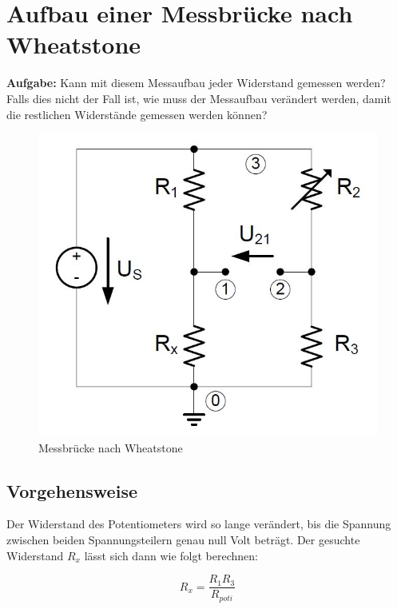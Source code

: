 \documentclass[10pt]{report}
\begin{document}
        \section{Aufbau einer Messbrücke nach Wheatstone}
        \textbf{Aufgabe:} Kann mit diesem Messaufbau jeder Widerstand gemessen werden? Falls dies nicht der
        Fall ist, wie muss der Messaufbau verändert werden, damit die restlichen Widerstände
        gemessen werden können?

		\begin{figure}[H]
            \includegraphics[width=\textwidth]{Wheatstone.jpg}
          \caption{Messbrücke nach Wheatstone}
        \end{figure}
		
        \subsection{Vorgehensweise}
        Der Widerstand des Potentiometers wird so lange verändert, bis die Spannung
        zwischen beiden Spannungsteilern genau null Volt beträgt. Der gesuchte
        Widerstand $R_x$ lässt sich dann wie folgt berechnen:

        \begin{equation*}
            R_x = \frac{R_1 R_3}{R_{poti}}
        \end{equation*}

        \vspace{0.5cm}
\end{document}

